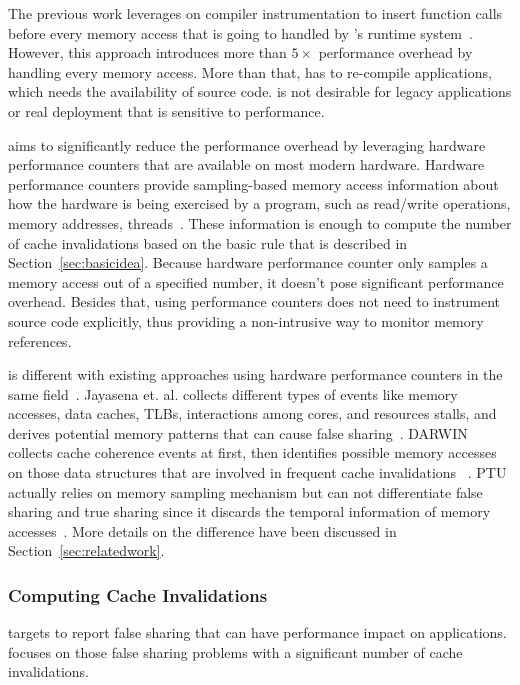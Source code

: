 The previous work \Predator{} leverages on compiler instrumentation to insert function calls before every memory access that is going to handled by \Predator{}'s runtime system~\cite{Predator}. However, this approach introduces more than $5\times$ performance overhead by handling every memory access. More than that, \Predator{} has to re-compile applications, which needs the availability of source code. \Predator{} is not desirable for legacy applications or real deployment that is sensitive to performance. 

\cheetah{} aims to significantly reduce the performance overhead by leveraging hardware performance counters that are available on most modern hardware. Hardware performance counters provide sampling-based memory access information about how the hardware is being exercised by a program, such as read/write operations, memory addresses, threads~\cite{Mucci99papi}. These information is enough to compute the number of cache invalidations based on the basic rule that is described in Section~\ref{sec:basicidea}. Because hardware performance counter only samples a memory access out of a specified number, it doesn't pose significant performance overhead. 
Besides that, using performance counters does not need to instrument source code explicitly, thus providing a non-intrusive way to monitor memory references. 

\cheetah{} is different with existing approaches using hardware performance counters in the same field~\cite{mldetect, openmp, detect:ptu}. Jayasena et. al. collects different types of events like memory accesses, data caches, TLBs, interactions among cores, and resources stalls, and derives potential memory patterns that can cause false sharing~\cite{mldetect}. DARWIN collects cache coherence events at first, then identifies possible memory accesses on those data structures that are involved in frequent cache invalidations ~\cite{openmp}. PTU actually relies on memory sampling mechanism but can not differentiate false sharing and true sharing since it discards the temporal information of memory accesses~\cite{detect:ptu}. More details on the difference have been discussed in Section~\ref{sec:relatedwork}.


\subsubsection{Computing Cache Invalidations}
\label{sec:computeinvalidations}

\Cheetah{} targets to report false sharing that can have performance impact on applications. \Cheetah{} focuses on those false sharing problems with a significant number of cache invalidations.  

